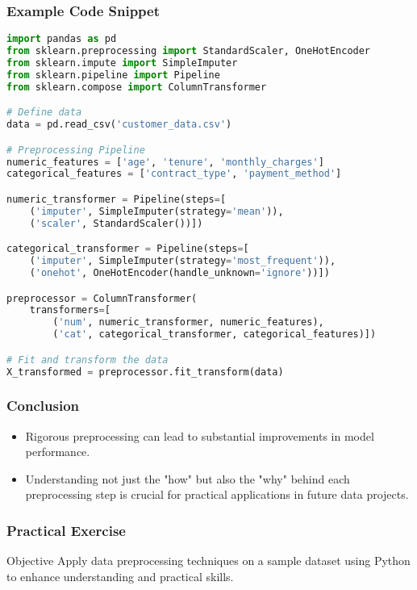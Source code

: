 \documentclass[aspectratio=169]{beamer}
\begin{document}
\begin{frame}[fragile]
    \frametitle{Example Code Snippet}
    \begin{lstlisting}[language=Python]
import pandas as pd
from sklearn.preprocessing import StandardScaler, OneHotEncoder
from sklearn.impute import SimpleImputer
from sklearn.pipeline import Pipeline
from sklearn.compose import ColumnTransformer

# Define data
data = pd.read_csv('customer_data.csv')

# Preprocessing Pipeline
numeric_features = ['age', 'tenure', 'monthly_charges']
categorical_features = ['contract_type', 'payment_method']

numeric_transformer = Pipeline(steps=[
    ('imputer', SimpleImputer(strategy='mean')),
    ('scaler', StandardScaler())])

categorical_transformer = Pipeline(steps=[
    ('imputer', SimpleImputer(strategy='most_frequent')),
    ('onehot', OneHotEncoder(handle_unknown='ignore'))])

preprocessor = ColumnTransformer(
    transformers=[
        ('num', numeric_transformer, numeric_features),
        ('cat', categorical_transformer, categorical_features)])

# Fit and transform the data
X_transformed = preprocessor.fit_transform(data)
    \end{lstlisting}
\end{frame}

\begin{frame}
    \frametitle{Conclusion}
    \begin{itemize}
        \item Rigorous preprocessing can lead to substantial improvements in model performance.
        \item Understanding not just the "how" but also the "why" behind each preprocessing step is crucial for practical applications in future data projects.
    \end{itemize}
\end{frame}

\begin{frame}[fragile]
    \frametitle{Practical Exercise}
    \begin{block}{Objective}
        Apply data preprocessing techniques on a sample dataset using Python to enhance understanding and practical skills.
    \end{block}
\end{frame}
\end{document}

